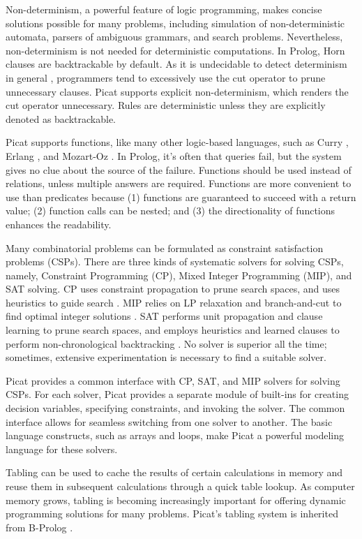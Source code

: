 \documentclass{new_tlp}
\begin{document}
Non-determinism, a powerful feature of logic programming, makes concise solutions possible for many problems, including simulation of non-deterministic automata, parsers of ambiguous grammars, and search problems. Nevertheless, non-determinism is not needed for deterministic computations. In Prolog, Horn clauses are backtrackable by default. As it is undecidable to detect determinism in general \cite{Debray88}, programmers tend to excessively use the cut operator to prune unnecessary clauses. Picat supports explicit non-determinism, which renders the cut operator unnecessary. Rules are deterministic unless they are explicitly denoted as backtrackable. 

Picat supports functions, like many other logic-based languages, such as Curry \cite{Hanus13}, Erlang \cite{Armstrong13}, and Mozart-Oz \cite{RoyH2004}. In Prolog, it's often that queries fail, but the system gives no clue about the source of the failure. Functions should be used instead of relations, unless multiple answers are required. Functions are more convenient to use than predicates because (1) functions are guaranteed to succeed with a return value; (2) function calls can be nested; and (3) the directionality of functions enhances the readability.

Many combinatorial problems can be formulated as constraint satisfaction problems (CSPs). There are three kinds of systematic solvers for solving CSPs, namely, Constraint Programming (CP), Mixed Integer Programming (MIP), and SAT solving. CP uses constraint propagation to prune search spaces, and uses heuristics to guide search \cite{Rossi06}. MIP relies on LP relaxation and branch-and-cut to find optimal integer solutions \cite{Appa10}. SAT performs unit propagation and clause learning to prune search spaces, and employs heuristics and learned clauses to perform non-chronological backtracking \cite{MalikZ09}. No solver is superior all the time; sometimes, extensive experimentation is necessary to find a suitable solver.

Picat provides a common interface with CP, SAT, and MIP solvers for solving CSPs. For each solver, Picat provides a separate module of built-ins for creating decision variables, specifying constraints, and invoking the solver. The common interface allows for seamless switching from one solver to another. The basic language constructs, such as arrays and loops, make Picat a powerful modeling language for these solvers.

Tabling \cite{warren92} can be used to cache the results of certain calculations in memory and reuse them in subsequent calculations through a quick table lookup. As computer memory grows, tabling is becoming increasingly important for offering dynamic programming solutions for many problems. Picat's tabling system is inherited from B-Prolog \cite{zhou08tab}. 
\end{document}
